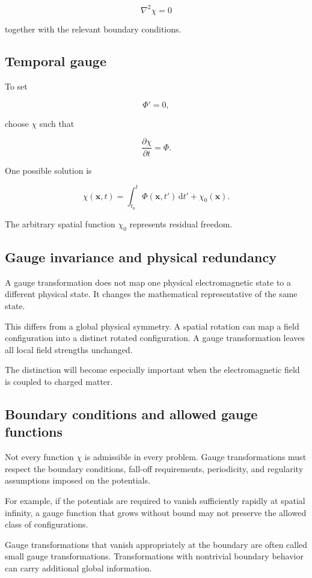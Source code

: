 \[
\boxed{
\nabla^2\chi=0
}
\]

together with the relevant boundary conditions.

\subsection{Temporal gauge}

To set

\[
\Phi'=0,
\]

choose \(\chi\) such that

\[
\frac{\partial\chi}{\partial t}
=
\Phi.
\]

One possible solution is

\[
\chi(\mathbf{x},t)
=
\int_{t_0}^{t}
\Phi(\mathbf{x},t')
\,\mathrm{d}t'
+
\chi_0(\mathbf{x}).
\]

The arbitrary spatial function \(\chi_0\) represents residual freedom.

\subsection{Gauge invariance and physical redundancy}

A gauge transformation does not map one physical electromagnetic state to a different physical state. It changes the mathematical representative of the same state.

This differs from a global physical symmetry. A spatial rotation can map a field configuration into a distinct rotated configuration. A gauge transformation leaves all local field strengths unchanged.

The distinction will become especially important when the electromagnetic field is coupled to charged matter.

\subsection{Boundary conditions and allowed gauge functions}

Not every function \(\chi\) is admissible in every problem. Gauge transformations must respect the boundary conditions, fall-off requirements, periodicity, and regularity assumptions imposed on the potentials.

For example, if the potentials are required to vanish sufficiently rapidly at spatial infinity, a gauge function that grows without bound may not preserve the allowed class of configurations.

Gauge transformations that vanish appropriately at the boundary are often called small gauge transformations. Transformations with nontrivial boundary behavior can carry additional global information.

